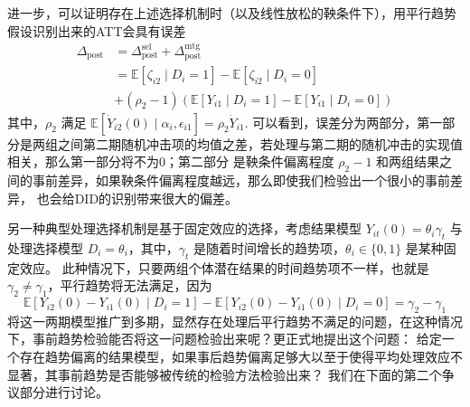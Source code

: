 \documentclass[../didNotes.tex]{subfiles}
\begin{document}
进一步，可以证明存在上述选择机制时（以及线性放松的鞅条件下），用平行趋势假设识别出来的ATT会具有误差
\begin{align*}
  \Delta_{\text{post}} & = \Delta_{\text{post}}^{\text{sel}} + \Delta_{\text{post}}^{\text{mtg}}
  \\
  & = \mathbb{E}[\zeta_{i 2} \mid D_{i}=1] - \mathbb{E}[\zeta_{i 2} \mid D_{i}=0]                   \\
  & + (\rho_{2}-1) \left(\mathbb{E}[Y_{i 1} \mid D_{i}=1] - \mathbb{E}[Y_{i 1} \mid D_{i}=0]\right)
\end{align*}
其中，$\rho_{2}$ 满足 $\mathbb{E}[\dot{Y}_{i 2}(0) \mid \alpha_{i}, \epsilon_{i 1}]=\rho_{2} \dot{Y}_{i 1}$.
可以看到，误差分为两部分，第一部分是两组之间第二期随机冲击项的均值之差，若处理与第二期的随机冲击的实现值相关，那么第一部分将不为0；第二部分
是鞅条件偏离程度 $\rho_{2}-1$ 和两组结果之间的事前差异，如果鞅条件偏离程度越远，那么即使我们检验出一个很小的事前差异，
也会给DID的识别带来很大的偏差。

另一种典型处理选择机制是基于固定效应的选择，考虑结果模型 $Y_{i t}(0) = \theta_{i} \gamma_{t}$
与处理选择模型 $D_{i} = \theta_{i}$，其中，$\gamma_{t}$ 是随着时间增长的趋势项，$\theta_{i} \in \{ 0,1 \}$ 是某种固定效应。
此种情况下，只要两组个体潜在结果的时间趋势项不一样，也就是 $\gamma_{2} \neq \gamma_{1}$，平行趋势将无法满足，因为
$$
\mathbb{E}[Y_{i 2}(0) - Y_{i 1}(0) \mid D_{i}=1] - \mathbb{E}[Y_{i 2}(0) - Y_{i 1}(0) \mid D_{i}=0] =
\gamma_{2} - \gamma_{1}
$$
将这一两期模型推广到多期，显然存在处理后平行趋势不满足的问题，在这种情况下，事前趋势检验能否将这一问题检验出来呢？更正式地提出这个问题：
给定一个存在趋势偏离的结果模型，如果事后趋势偏离足够大以至于使得平均处理效应不显著，其事前趋势是否能够被传统的检验方法检验出来？
我们在下面的第二个争议部分进行讨论。
\end{document}
